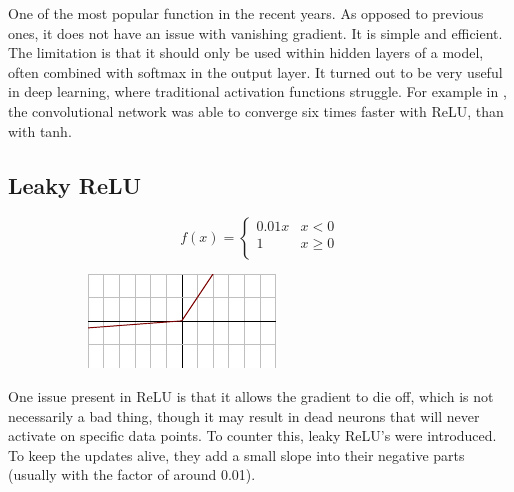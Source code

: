 \noindent
One of the most popular function in the recent years. As opposed to previous ones, it does not have an issue with vanishing gradient. It is simple and efficient. The limitation is that it should only be used within hidden layers of a model, often combined with softmax in the output layer. It turned out to be very useful in deep learning, where traditional activation functions struggle. For example in \cite{relu_faster}, the convolutional network was able to converge six times faster with ReLU, than with tanh.

\subsection*{Leaky ReLU}

\begin{figure}[H]
\raggedright
\begin{subfigure}{.38\textwidth}
  \centering
  \[
f(x) = \begin{cases}
       0.01x & x < 0 \\
       1 & x \geq 0 \\
     \end{cases} \]  
\end{subfigure}%
\begin{subfigure}{.25\textwidth}
  \centering
  \includegraphics[width=\textwidth]{tex/images/activation/lrelu}
\end{subfigure}
\end{figure}

\noindent
One issue present in ReLU is that it allows the gradient to die off, which is not necessarily a bad thing, though it may result in dead neurons that will never activate on specific data points. To counter this, leaky ReLU's were introduced. To keep the updates alive, they add a small slope into their negative parts (usually with the factor of around 0.01).
   
